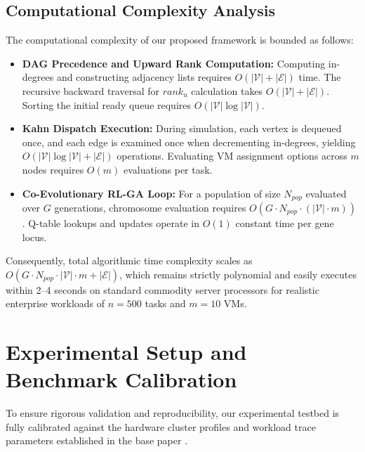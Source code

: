 \documentclass[default,sn-mathphys-num]{sn-jnl}
\theoremstyle{thmstyleone}
\theoremstyle{thmstyletwo}
\theoremstyle{thmstylethree}
\begin{document}
\subsection{Computational Complexity Analysis}
The computational complexity of our proposed framework is bounded as follows:
\begin{itemize}
    \item \textbf{DAG Precedence and Upward Rank Computation:} Computing in-degrees and constructing adjacency lists requires $O(|\mathcal{V}| + |\mathcal{E}|)$ time. The recursive backward traversal for $rank_u$ calculation takes $O(|\mathcal{V}| + |\mathcal{E}|)$. Sorting the initial ready queue requires $O(|\mathcal{V}| \log |\mathcal{V}|)$.
    \item \textbf{Kahn Dispatch Execution:} During simulation, each vertex is dequeued once, and each edge is examined once when decrementing in-degrees, yielding $O(|\mathcal{V}| \log |\mathcal{V}| + |\mathcal{E}|)$ operations. Evaluating VM assignment options across $m$ nodes requires $O(m)$ evaluations per task.
    \item \textbf{Co-Evolutionary RL-GA Loop:} For a population of size $N_{pop}$ evaluated over $G$ generations, chromosome evaluation requires $O(G \cdot N_{pop} \cdot (|\mathcal{V}| \cdot m))$. Q-table lookups and updates operate in $O(1)$ constant time per gene locus.
\end{itemize}
Consequently, total algorithmic time complexity scales as $O(G \cdot N_{pop} \cdot |\mathcal{V}| \cdot m + |\mathcal{E}|)$, which remains strictly polynomial and easily executes within 2--4 seconds on standard commodity server processors for realistic enterprise workloads of $n = 500$ tasks and $m = 10$ VMs.

\section{Experimental Setup and Benchmark Calibration}\label{sec:setup}

To ensure rigorous validation and reproducibility, our experimental testbed is fully calibrated against the hardware cluster profiles and workload trace parameters established in the base paper \cite{narsimhulu2026hybrid}.
\end{document}
